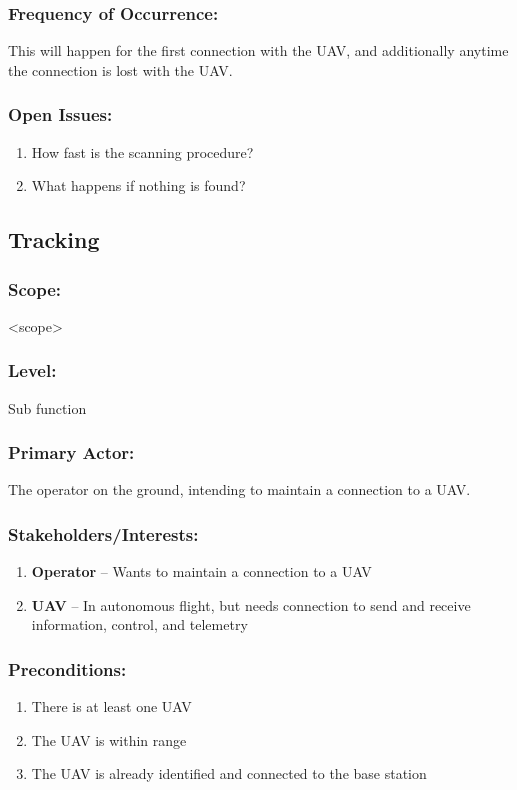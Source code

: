 \documentclass[ProductRequirements.tex]{subfiles}
\begin{document}
		\subsubsection*{Frequency of Occurrence:}
			This will happen for the first connection with the UAV, and additionally anytime the connection is lost with the UAV.
		\subsubsection*{Open Issues:}
			\begin{enumerate}\itemsep1pt
				\item How fast is the scanning procedure?
				\item What happens if nothing is found?
			\end{enumerate}		
	
	\subsection{Tracking}
	\subsubsection*{Scope:}
	<scope>
	\subsubsection*{Level:}
	Sub function
	\subsubsection*{Primary Actor:}
	The operator on the ground, intending to maintain a connection to a UAV.
	\subsubsection*{Stakeholders/Interests:}
	\begin{enumerate}\itemsep1pt
		\item \textbf{Operator} -- Wants to maintain a connection to a UAV
		\item \textbf{UAV} -- In autonomous flight, but needs connection to send and receive information, control, and telemetry
	\end{enumerate}
	\subsubsection*{Preconditions:}
	\begin{enumerate}\itemsep1pt
		\item There is at least one UAV
		\item The UAV is within range
		\item The UAV is already identified and connected to the base station
	\end{enumerate}
\end{document}

